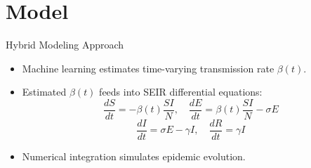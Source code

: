 \documentclass{beamer}
\begin{document}

\section{Model}

\begin{frame}{Hybrid Modeling Approach}
\begin{itemize}
\item Machine learning estimates time-varying transmission rate $\beta(t)$.
\item Estimated $\beta(t)$ feeds into SEIR differential equations:
\[
\frac{dS}{dt}=-\beta(t)\frac{SI}{N},\quad
\frac{dE}{dt}=\beta(t)\frac{SI}{N}-\sigma E
\]
\[
\frac{dI}{dt}=\sigma E-\gamma I,\quad
\frac{dR}{dt}=\gamma I
\]
\item Numerical integration simulates epidemic evolution.
\end{itemize}
\end{frame}

\end{document}
